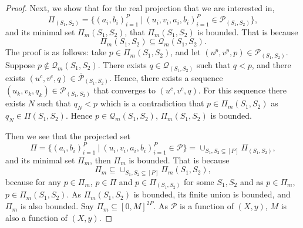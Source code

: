 \documentclass{article}
\begin{document}
\begin{proof}
Next, we show that for the real projection that we are interested in,
\[
\Pi_{(S_1,S_2)} = \Big\{(a_i, b_i)_{i=1}^{P} \ | \ (u_i, v_i, a_i, b_i)_{i=1}^{P} \in \mathcal{P}_{(S_1,S_2)} \Big\},
\]
and its minimal set $\Pi_{m}(S_1,S_2)$, that $\Pi_{m}(S_1,S_2)$ is bounded. That is because
\[
\Pi_{m}(S_1,S_2) \subseteq \mathcal{Q}_m(S_1,S_2).
\]
The proof is as follows: take $p \in \Pi_m(S_1,S_2)$, and let $(u^{p}, v^{p}, p) \in \mathcal{P}_{(S_1,S_2)}$. Suppose $p \notin \mathcal{Q}_m(S_1,S_2)$. There exists $q \in \mathcal{Q}_{(S_1,S_2)}$ such that $q < p$, and there exists $(u^c, v^c, q) \in \mathcal{\bar{P}}_{(S_1,S_2)}$. Hence, there exists a sequence $(u_k, v_k, q_k) \in \mathcal{P}_{(S_1,S_2)}$ that converges to $(u^c, v^c, q)$. For this sequence there exists $N$ such that $q_N < p$ which is a contradiction that $p \in \Pi_m(S_1,S_2)$ as $q_N \in \Pi(S_1,S_2)$. Hence $p \in \mathcal{Q}_m(S_1,S_2)$, $\Pi_{m}(S_1,S_2)$ is bounded. 

Then we see that the projected set
\[
\Pi = \Big\{(a_i, b_i)_{i=1}^{P} \ | \ (u_i, v_i, a_i, b_i)_{i=1}^{P} \in \mathcal{P} \Big\} = \cup_{S_1,S_2 \subseteq [P]} \Pi_{(S_1,S_2)},
\]
and its minimal set $\Pi_m$, then $\Pi_m$ is bounded. That is because 
\[
\Pi_m \subseteq \cup_{S_1,S_2 \subseteq [P]} \Pi_m(S_1,S_2),
\] 
because for any $p \in \Pi_m$, $p \in \Pi$ and $p \in \Pi_{(S_1,S_2)}$ for some $S_1, S_2$ and as $p \in \Pi_m$, $p \in \Pi_m(S_1,S_2)$. As $\Pi_m(S_1,S_2)$ is bounded, its finite union is bounded, and $\Pi_m$ is also bounded. 
Say $\Pi_m \subseteq [0, M]^{2P}$. As $\mathcal{P}$ is a function of $(X, y)$, $M$ is also a function of $(X, y)$.


\end{proof}
\end{document}
